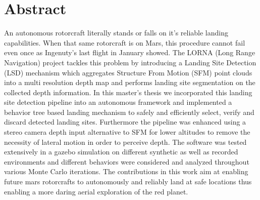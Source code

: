 \chapter*{Abstract}

An autonomous rotorcraft literally stands or falls on it's reliable landing capabilities. When that same rotorcraft is on Mars, this procedure cannot fail even once as Ingenuty's last flight in January showed. The LORNA (Long Range Navigation) project tackles this problem by introducing a Landing Site Detection (LSD) mechanism which aggregates Structure From Motion (SFM) point clouds into a multi resolution depth map and performs landing site segmentation on the collected depth information. In this master’s thesis we incorporated this landing site detection pipeline into an autonomous framework and implemented a behavior tree based landing mechanism to safely and efficiently select, verify and discard detected landing sites. Furthermore the pipeline was enhanced using a stereo camera depth input alternative to SFM for lower altitudes to remove the necessity of lateral motion in order to perceive depth. The software was tested extensively in a gazebo simulation on different synthetic as well as recorded environments and different behaviors were considered and analyzed throughout various Monte Carlo iterations. The contributions in this work aim at enabling future mars rotorcrafts to autonomously and reliably land at safe locations thus enabling a more daring aerial exploration of the red planet.
